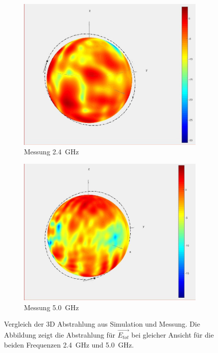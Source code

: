 \begin{figure}[h!]
	\begin{subfigure}[t]{0.49\textwidth}
	 	\includegraphics[width=1\textwidth]{../fig/plt/2_4GHz_justsphere.jpg}
		\caption{Messung \SI{2.4}{\giga\hertz}}
	\end{subfigure}
	\begin{subfigure}[t]{0.49\textwidth}
		\includegraphics[width=1\textwidth]{../fig/plt/5GHz_just_sphere.jpg}
		\caption{Messung \SI{5.0}{\giga\hertz}}
	\end{subfigure}
	\caption[Vergleich der 3D Abstrahlung aus Simulation und Messung]{
		Vergleich der 3D Abstrahlung aus Simulation und Messung.
		Die Abbildung zeigt die Abstrahlung für $\vec{E_{tot}}$
		bei gleicher Ansicht für die beiden Frequenzen
		\SI{2.4}{\giga\hertz} und \SI{5.0}{\giga\hertz}.}
\end{figure}

